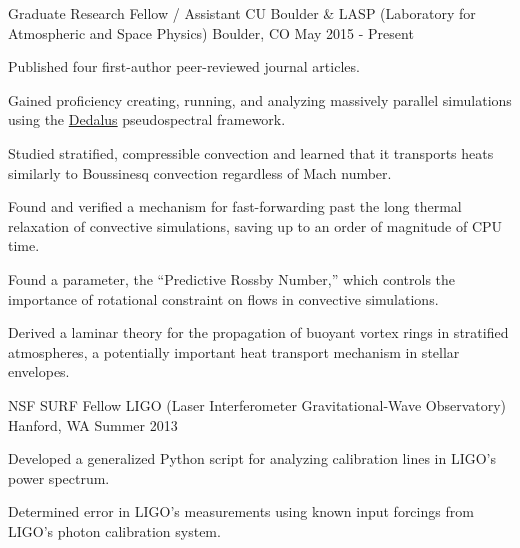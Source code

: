 

\begin{cventries}

  \cventry
    {Graduate Research Fellow / Assistant} %
    {CU Boulder \& LASP (Laboratory for Atmospheric and Space Physics)} %
    {Boulder, CO} %
    {May 2015 - Present} %
    {
      \begin{cvitems} %
	  	\item { Published four first-author peer-reviewed journal articles. }
        \item { Gained proficiency creating, running, and analyzing massively parallel simulations using the \href{http://dedalus-project.org}{Dedalus} pseudospectral framework. }
		\item { Studied stratified, compressible convection and learned that it transports heats similarly to Boussinesq convection regardless of Mach number.}
		\item { Found and verified a mechanism for fast-forwarding past the long thermal relaxation of convective simulations, saving up to an order of magnitude of CPU time.} 
		\item { Found a parameter, the ``Predictive Rossby Number,'' which controls the importance of rotational constraint on flows in convective simulations.}
		\item { Derived a laminar theory for the propagation of buoyant vortex rings in stratified atmospheres, a potentially important heat transport mechanism in stellar envelopes.}
      \end{cvitems}
    }

  \cventry
    {NSF SURF Fellow} %
    {LIGO (Laser Interferometer Gravitational-Wave Observatory)} %
    {Hanford, WA} %
    {Summer 2013} %
    {
      \begin{cvitems} %
        \item {Developed a generalized Python script for analyzing calibration lines in LIGO's power spectrum.}
        \item {Determined error in LIGO's measurements using known input forcings from LIGO's photon calibration system.}
      \end{cvitems}
    }


\end{cventries}

